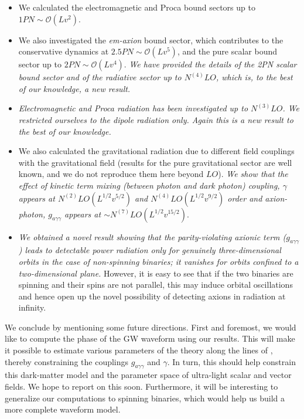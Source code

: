 \begin{itemize}
\item We calculated the electromagnetic and Proca bound sectors up to $1PN \sim \mathcal{O}(Lv^2)$. 

\item We also investigated the \textit{em-axion} bound sector, which contributes to the conservative dynamics at $2.5PN\sim \mathcal{O}(Lv^5)$, and the pure scalar bound sector up to $2PN \sim \mathcal{O}(Lv^4)$. \textit{We have provided the details of the 2PN scalar bound sector and of the radiative sector up to $N^{(4)}LO$, which is, to the best of our knowledge, a new result.}

\item \textit{Electromagnetic and Proca radiation has been investigated up to $N^{(3)}LO$. We restricted ourselves to the dipole radiation only. Again this is a new result to the best of our knowledge.} 

\item We also calculated the gravitational radiation due to different field couplings with the gravitational field (results for the pure gravitational sector are well known, and we do not reproduce them here beyond $LO$). \textit{We show that the effect of kinetic term mixing (between photon and dark photon) coupling,  $\gamma$ appears at $N^{(2)}LO (L^{1/2}v^{5/2})$ and $N^{(4)}LO (L^{1/2}v^{9/2}) $ order and
axion-photon, $g_{a\gamma\gamma}$ appears at $\sim N^{(7)}LO(L^{1/2}v^{15/2})$}.  
        
\item \textit{We obtained a novel result showing that the parity-violating axionic term ($g_{a\gamma\gamma}$) leads to detectable power radiation only for genuinely three-dimensional orbits in the case of non-spinning binaries; it vanishes for orbits confined to a two-dimensional plane.} However, it is easy to see that if the two binaries are spinning and their spins are not parallel, this may induce orbital oscillations and hence open up the novel possibility of detecting axions in radiation at infinity.

\end{itemize}

We conclude by mentioning some future directions. First and foremost, we would like to compute the phase of the GW waveform using our results. This will make it possible to estimate various parameters of the theory along the lines of \cite{Zhang:2021mks}, thereby constraining the couplings $g_{a\gamma\gamma}$ and $\gamma$. In turn, this should help constrain this dark-matter model and the parameter space of ultra-light scalar and vector fields. We hope to report on this soon. Furthermore, it will be interesting to generalize our computations to spinning binaries, which would help us build a more complete waveform model. \par 

